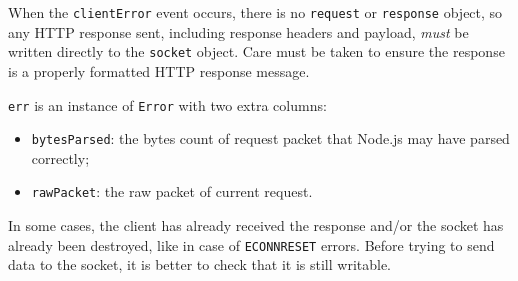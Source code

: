 \begin{Shaded}
\begin{Highlighting}[]
\OperatorTok{=} \NormalTok{(}\NormalTok{)}\OperatorTok{;}

\OperatorTok{=}\OperatorTok{,}\KeywordTok{=\textgreater{}}\NormalTok{ \{}
\NormalTok{()}\OperatorTok{;}
\NormalTok{\})}\OperatorTok{;}
\NormalTok{(}\OperatorTok{,}\OperatorTok{,}\KeywordTok{=\textgreater{}}\NormalTok{ \{}
\NormalTok{(}\StringTok{\textquotesingle{}}\NormalTok{)}\OperatorTok{;}
\NormalTok{\})}\OperatorTok{;}
\NormalTok{(}\NormalTok{)}\OperatorTok{;}
\end{Highlighting}
\end{Shaded}

When the \texttt{\textquotesingle{}clientError\textquotesingle{}} event
occurs, there is no \texttt{request} or \texttt{response} object, so any
HTTP response sent, including response headers and payload, \emph{must}
be written directly to the \texttt{socket} object. Care must be taken to
ensure the response is a properly formatted HTTP response message.

\texttt{err} is an instance of \texttt{Error} with two extra columns:

\begin{itemize}
\tightlist
\item
  \texttt{bytesParsed}: the bytes count of request packet that Node.js
  may have parsed correctly;
\item
  \texttt{rawPacket}: the raw packet of current request.
\end{itemize}

In some cases, the client has already received the response and/or the
socket has already been destroyed, like in case of \texttt{ECONNRESET}
errors. Before trying to send data to the socket, it is better to check
that it is still writable.

